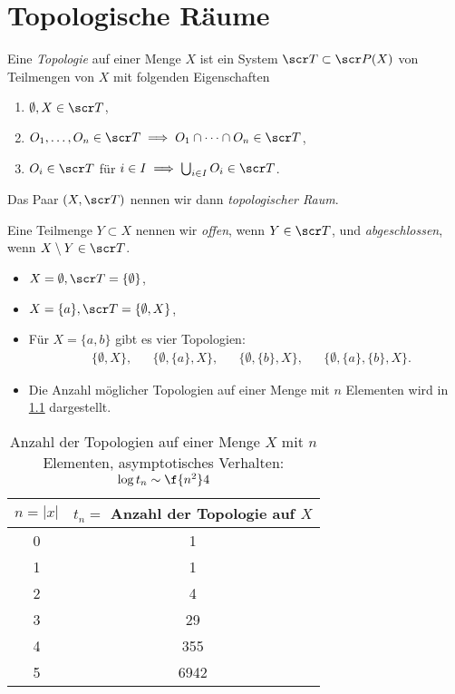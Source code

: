 
\chapter{Topologische Räume}


\begin{df}
	Eine \emph{Topologie} auf einer Menge $X$ ist ein System $\scr T \subset \scr P(X)$ von Teilmengen von $X$ mit folgenden Eigenschaften
	\begin{enumerate}[O1)]
		\item
			$\emptyset, X \in \scr T$,
		\item
			$O_1, \dotsc, O_n \in \scr T \implies O_1 \cap \dotsb \cap O_n \in \scr T$,
		\item
			$O_i \in \scr T$ für $i \in I \implies \bigcup_{i\in I} O_i \in \scr T$.
	\end{enumerate}
	Das Paar $(X, \scr T)$ nennen wir dann \emph{topologischer Raum}.

	Eine Teilmenge $Y \subset X$ nennen wir \emph{offen}, wenn $Y \in \scr T$, und \emph{abgeschlossen}, wenn $X \setminus Y \in \scr T$.
\end{df}

\begin{ex}
	\begin{itemize}
		\item
			$X = \emptyset, \scr T = \{\emptyset\}$,
		\item
			$X = \{a\}, \scr T = \{ \emptyset, X \}$,
		\item
			Für $X = \{a,b\}$ gibt es vier Topologien:
			\begin{align*}
				&\{\emptyset, X\}, &
				&\{\emptyset, \{a\}, X\}, &
				&\{\emptyset, \{b\}, X \}, &
				&\{\emptyset, \{a\}, \{b\}, X\}.
			\end{align*}
		\item
			Die Anzahl möglicher Topologien auf einer Menge mit $n$ Elementen wird in \ref{tab:topcount} dargestellt.
	\end{itemize}
	\begin{table}[h]
		\centering
		\begin{tabular}{c|c}
			$n=|x|$ & $t_n = $ Anzahl der Topologie auf $X$ \\ \hline
			0 & 1 \\
			1 & 1 \\
			2 & 4 \\
			3 & 29 \\
			4 & 355 \\
			5 & 6942
		\end{tabular}
		\caption{Anzahl der Topologien auf einer Menge $X$ mit $n$ Elementen, asymptotisches Verhalten: $\log t_n \sim \f {n^2}4$}
		\label{tab:topcount}
	\end{table}
\end{ex}

